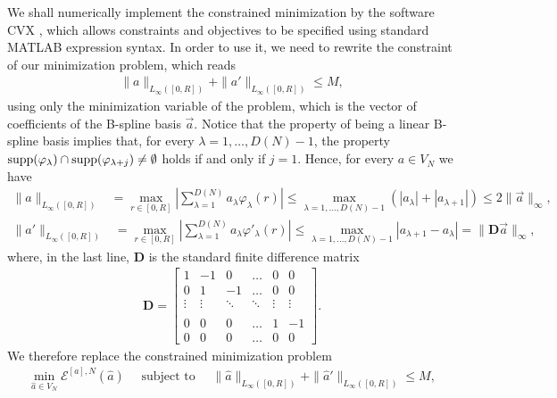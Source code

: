 We shall numerically implement the constrained minimization by the software CVX \cite{cvx,gb08}, which allows constraints and objectives to be specified using standard MATLAB expression syntax. In order to use it, we need to rewrite the constraint of our minimization problem, which reads
\begin{align*}
	\|a\|_{L_{\infty}([0,R])} + \|a'\|_{L_{\infty}([0,R])} \leq M,
\end{align*}
using only the minimization variable of the problem, which is the vector of coefficients of the B-spline basis $\vec{a}$. Notice that the property of being a linear B-spline basis implies that, for every $\lambda = 1, \ldots, D(N)-1$, the property $\operatorname{supp}(\varphi_{\lambda}) \cap \operatorname{supp}(\varphi_{\lambda + j}) \not= \emptyset$ holds if and only if $j = 1$. Hence, for every $a \in V_N$ we have
\begin{align*}
\|a\|_{L_{\infty}([0,R])} &= \max_{r \in [0,R]} \left|\sum^{D(N)}_{\lambda = 1} a_{\lambda} \varphi_{\lambda}(r)\right|
 \leq \max_{\lambda = 1, \ldots, D(N)-1} \left(|a_{\lambda}| + |a_{\lambda+1}|\right) 
 \leq 2 \|\vec{a}\|_{\infty},
\end{align*}
\begin{align*}
\|a'\|_{L_{\infty}([0,R])} &= \max_{r \in [0,R]} \left|\sum^{D(N)}_{\lambda = 1} a_{\lambda} \varphi'_{\lambda}(r)\right| 
 \leq \max_{\lambda = 1, \ldots, D(N)-1} |a_{\lambda+1} - a_{\lambda}|
 = \|\mathbf D\vec{a}\|_{\infty},
\end{align*}
where, in the last line, $\mathbf  D$ is the standard finite difference matrix
\begin{align*}
\mathbf  D = \begin{bmatrix}
    1       & -1 & 0 & \dots & 0 & 0 \\
    0     & 1 & -1 & \dots & 0 & 0 \\
   \vdots & \vdots & \ddots & \ddots & \vdots & \vdots \\ \\
    0       & 0 & 0 & \dots & 1 & -1 \\
    0       & 0 & 0 & \dots & 0 & 0
\end{bmatrix}.
\end{align*}
We therefore replace the constrained minimization problem
\begin{align*}
\min_{\widehat{a} \in V_N} \mathcal{E}^{[a],N}(\widehat{a}) \quad \text{ subject to } \quad \|\widehat{a}\|_{L_{\infty}([0,R])} + \|\widehat{a}'\|_{L_{\infty}([0,R])} \leq M,
\end{align*}
